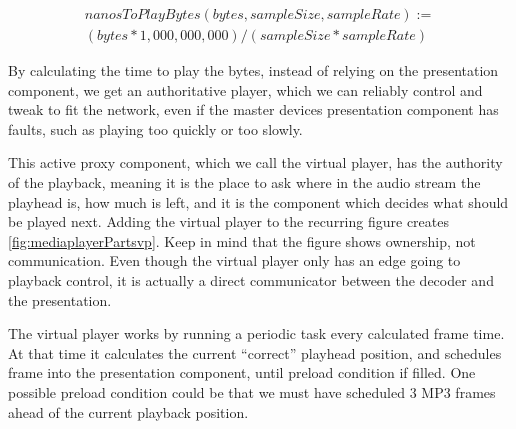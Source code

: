\begin{equation}\label{eq:ntpb}
	\begin{split}
		nanosToPlayBytes(bytes, sampleSize, sampleRate) :=\\
		(bytes * 1,000,000,000) / (sampleSize * sampleRate)
	\end{split}
\end{equation}

By calculating the time to play the bytes, instead of relying on the
presentation component, we get an authoritative player, which we can
reliably control and tweak to fit the network, even if the master
devices presentation component has faults, such as playing too quickly
or too slowly.

This active proxy component, which we call the virtual player, has the
authority of the playback, meaning it is the place to ask where in the
audio stream the playhead is, how much is left, and it is the component
which decides what should be played next. Adding the virtual player to
the recurring figure creates \cref{fig:mediaplayerPartsvp}. Keep in mind
that the figure shows ownership, not communication. Even though the
virtual player only has an edge going to playback control, it is actually
a direct communicator between the decoder and the presentation.

The virtual player works by running a periodic task every calculated
frame time. At that time it calculates the current ``correct'' playhead
position, and schedules frame into the presentation component, until
preload condition if filled. One possible preload condition could be
that we must have scheduled 3 MP3 frames ahead of the current playback
position.

